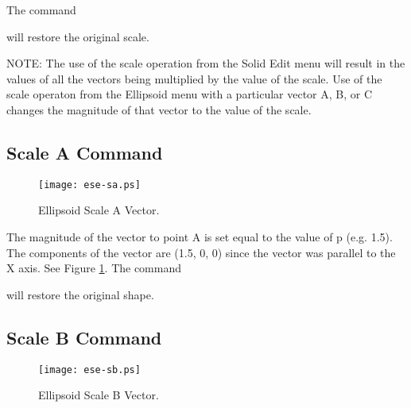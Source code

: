 The command


will restore the original scale.

NOTE:
The use
of the scale operation from the Solid Edit menu
will result in the values of all the vectors being
multiplied by the value of the scale.
Use of the scale operaton from the Ellipsoid menu
with a particular vector A, B, or C changes the
magnitude of that vector to the value of the scale.

\subsection{Scale A Command}

\begin{figure}
\centering \texttt{[image: ese-sa.ps]}
\caption{Ellipsoid Scale A Vector.}
\label{ese-sa}
\end{figure}


The magnitude of the vector to point A is set equal to the value of p
(e.g. 1.5).
The components of the vector are (1.5, 0, 0) since the vector was
parallel to the X axis.  See Figure \ref{ese-sa}.  The command


will restore the original shape.

\subsection{Scale B Command}

\begin{figure}
\centering \texttt{[image: ese-sb.ps]}
\caption{Ellipsoid Scale B Vector.}
\label{ese-sb}
\end{figure}


